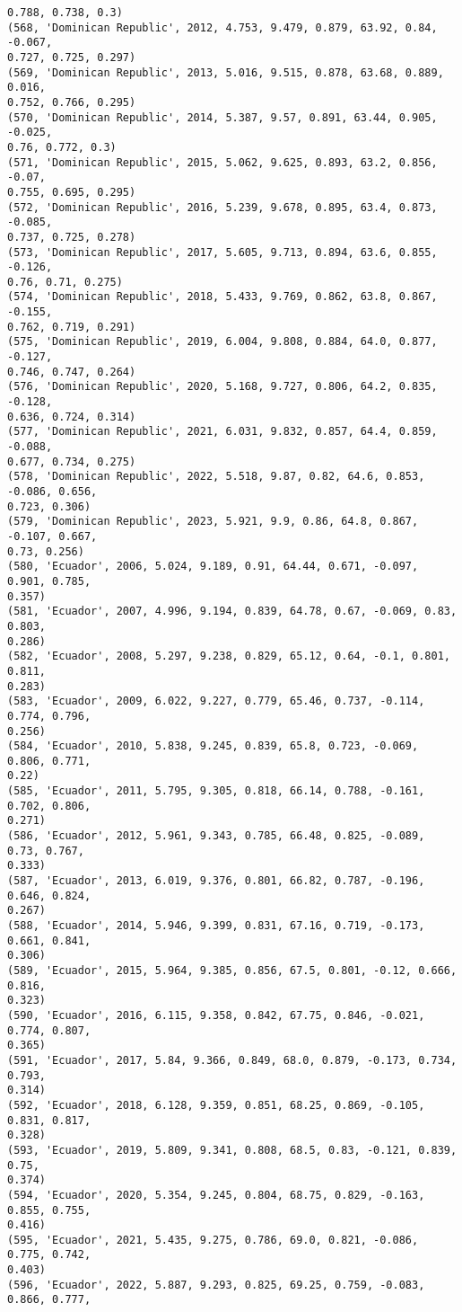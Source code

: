 \documentclass[11pt]{article}
\begin{document}
\begin{Verbatim}[commandchars=\\\{\}]
0.788, 0.738, 0.3)
(568, 'Dominican Republic', 2012, 4.753, 9.479, 0.879, 63.92, 0.84, -0.067,
0.727, 0.725, 0.297)
(569, 'Dominican Republic', 2013, 5.016, 9.515, 0.878, 63.68, 0.889, 0.016,
0.752, 0.766, 0.295)
(570, 'Dominican Republic', 2014, 5.387, 9.57, 0.891, 63.44, 0.905, -0.025,
0.76, 0.772, 0.3)
(571, 'Dominican Republic', 2015, 5.062, 9.625, 0.893, 63.2, 0.856, -0.07,
0.755, 0.695, 0.295)
(572, 'Dominican Republic', 2016, 5.239, 9.678, 0.895, 63.4, 0.873, -0.085,
0.737, 0.725, 0.278)
(573, 'Dominican Republic', 2017, 5.605, 9.713, 0.894, 63.6, 0.855, -0.126,
0.76, 0.71, 0.275)
(574, 'Dominican Republic', 2018, 5.433, 9.769, 0.862, 63.8, 0.867, -0.155,
0.762, 0.719, 0.291)
(575, 'Dominican Republic', 2019, 6.004, 9.808, 0.884, 64.0, 0.877, -0.127,
0.746, 0.747, 0.264)
(576, 'Dominican Republic', 2020, 5.168, 9.727, 0.806, 64.2, 0.835, -0.128,
0.636, 0.724, 0.314)
(577, 'Dominican Republic', 2021, 6.031, 9.832, 0.857, 64.4, 0.859, -0.088,
0.677, 0.734, 0.275)
(578, 'Dominican Republic', 2022, 5.518, 9.87, 0.82, 64.6, 0.853, -0.086, 0.656,
0.723, 0.306)
(579, 'Dominican Republic', 2023, 5.921, 9.9, 0.86, 64.8, 0.867, -0.107, 0.667,
0.73, 0.256)
(580, 'Ecuador', 2006, 5.024, 9.189, 0.91, 64.44, 0.671, -0.097, 0.901, 0.785,
0.357)
(581, 'Ecuador', 2007, 4.996, 9.194, 0.839, 64.78, 0.67, -0.069, 0.83, 0.803,
0.286)
(582, 'Ecuador', 2008, 5.297, 9.238, 0.829, 65.12, 0.64, -0.1, 0.801, 0.811,
0.283)
(583, 'Ecuador', 2009, 6.022, 9.227, 0.779, 65.46, 0.737, -0.114, 0.774, 0.796,
0.256)
(584, 'Ecuador', 2010, 5.838, 9.245, 0.839, 65.8, 0.723, -0.069, 0.806, 0.771,
0.22)
(585, 'Ecuador', 2011, 5.795, 9.305, 0.818, 66.14, 0.788, -0.161, 0.702, 0.806,
0.271)
(586, 'Ecuador', 2012, 5.961, 9.343, 0.785, 66.48, 0.825, -0.089, 0.73, 0.767,
0.333)
(587, 'Ecuador', 2013, 6.019, 9.376, 0.801, 66.82, 0.787, -0.196, 0.646, 0.824,
0.267)
(588, 'Ecuador', 2014, 5.946, 9.399, 0.831, 67.16, 0.719, -0.173, 0.661, 0.841,
0.306)
(589, 'Ecuador', 2015, 5.964, 9.385, 0.856, 67.5, 0.801, -0.12, 0.666, 0.816,
0.323)
(590, 'Ecuador', 2016, 6.115, 9.358, 0.842, 67.75, 0.846, -0.021, 0.774, 0.807,
0.365)
(591, 'Ecuador', 2017, 5.84, 9.366, 0.849, 68.0, 0.879, -0.173, 0.734, 0.793,
0.314)
(592, 'Ecuador', 2018, 6.128, 9.359, 0.851, 68.25, 0.869, -0.105, 0.831, 0.817,
0.328)
(593, 'Ecuador', 2019, 5.809, 9.341, 0.808, 68.5, 0.83, -0.121, 0.839, 0.75,
0.374)
(594, 'Ecuador', 2020, 5.354, 9.245, 0.804, 68.75, 0.829, -0.163, 0.855, 0.755,
0.416)
(595, 'Ecuador', 2021, 5.435, 9.275, 0.786, 69.0, 0.821, -0.086, 0.775, 0.742,
0.403)
(596, 'Ecuador', 2022, 5.887, 9.293, 0.825, 69.25, 0.759, -0.083, 0.866, 0.777,

\end{Verbatim}
\end{document}
